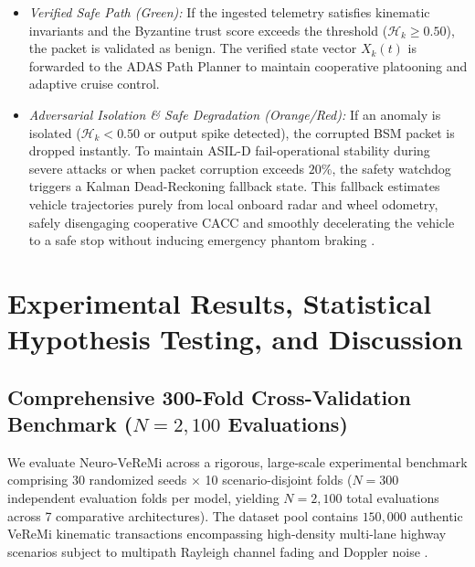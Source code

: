 \documentclass[journal]{IEEEtran}
\begin{document}
\begin{itemize}
    \item \textit{Verified Safe Path (Green):} If the ingested telemetry satisfies kinematic invariants and the Byzantine trust score exceeds the threshold ($\mathcal{H}_k \ge 0.50$), the packet is validated as benign. The verified state vector $X_k(t)$ is forwarded to the ADAS Path Planner to maintain cooperative platooning and adaptive cruise control.
    \item \textit{Adversarial Isolation \& Safe Degradation (Orange/Red):} If an anomaly is isolated ($\mathcal{H}_k < 0.50$ or output spike detected), the corrupted BSM packet is dropped instantly. To maintain ASIL-D fail-operational stability during severe attacks or when packet corruption exceeds $20\%$, the safety watchdog triggers a Kalman Dead-Reckoning fallback state. This fallback estimates vehicle trajectories purely from local onboard radar and wheel odometry, safely disengaging cooperative CACC and smoothly decelerating the vehicle to a safe stop without inducing emergency phantom braking \cite{iso26262}.
\end{itemize}

\section{Experimental Results, Statistical Hypothesis Testing, and Discussion}

\subsection{Comprehensive 300-Fold Cross-Validation Benchmark ($N=2{,}100$ Evaluations)}
We evaluate Neuro-VeReMi across a rigorous, large-scale experimental benchmark comprising 30 randomized seeds $\times$ 10 scenario-disjoint folds ($N=300$ independent evaluation folds per model, yielding $N=2{,}100$ total evaluations across 7 comparative architectures). The dataset pool contains $150{,}000$ authentic VeReMi kinematic transactions \cite{van2018veremi, kamel2020simulation} encompassing high-density multi-lane highway scenarios subject to multipath Rayleigh channel fading and Doppler noise \cite{so2019physical}.
\end{document}

